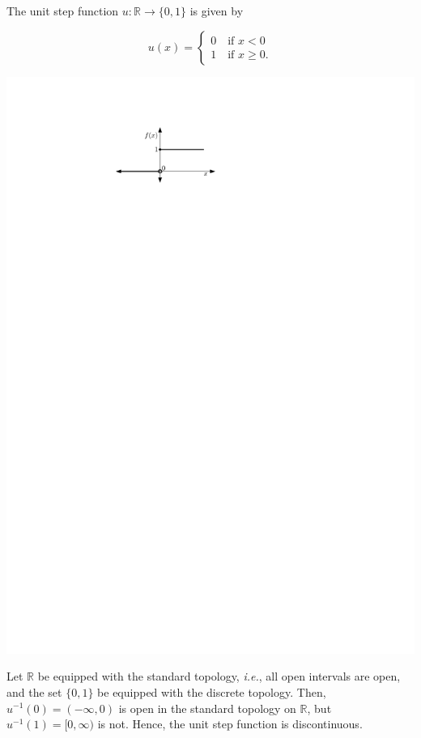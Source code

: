 \documentclass[a4paper,english,12pt]{article}
\begin{document}
\begin{exmp}
The unit step function $u:\mathbb{R}\to \{0,1\}$ is given by 

  \begin{minipage}{.5\textwidth}
	\begin{equation*}
	u(x)= \begin{cases}
			0 \quad \text{if $x<0$}\\
			1 \quad \text{if $x\geqslant 0$}.
			\end{cases}
	\end{equation*}
  \end{minipage}%
  \begin{minipage}{.25\textwidth}
    \centering
    \includegraphics[scale=0.7]{Figures/step.pdf}
  \end{minipage}
  
\noindent Let $\mathbb{R}$ be equipped with the standard topology, \emph{i.e.}, all open intervals are open, and the set $\{0,1\}$ be equipped with the discrete topology. Then, $u^{-1}(0)=(-\infty,0)$ is open in the standard topology on $\mathbb{R}$, but $u^{-1}(1)=[0,\infty)$ is not. Hence, the unit step function is discontinuous.
\end{exmp}
\end{document}
